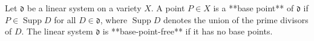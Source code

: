 Let $\mathfrak{d}$ be a linear system on a variety $X$. A point $P \in X$ is a **base point** of $\mathfrak{d}$ if $P \in \operatorname{Supp} D$ for all $D \in \mathfrak{d}$, where $\operatorname{Supp} D$ denotes the union of the prime divisors of $D$. The linear system $\mathfrak{d}$ is **base-point-free** if it has no base points.
